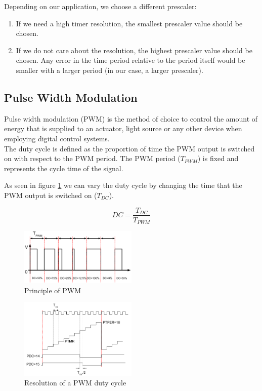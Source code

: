 Depending on our application, we choose a different prescaler:
\begin{enumerate}
    \item If we need a high timer resolution, the smallest prescaler value should be chosen. 
    \item If we do not care about the resolution, the highest prescaler value should be chosen. Any error in the time period relative to the period itself would be smaller with a larger period (in our case, a larger prescaler).
\end{enumerate}

\subsection{Pulse Width Modulation} 

\noindent
Pulse width modulation (PWM) is the method of choice to control the amount of energy that is supplied to an actuator, light source or any other device when employing digital control systems.\\
The duty cycle is defined as the proportion of time the PWM output is switched on with respect to the PWM period.
The PWM period ($T_{PWM}$) is fixed and represents the cycle time of the signal.

\noindent
As seen in figure \ref{fig:pwm_demo} we can vary the duty cycle by changing the time that the PWM output is switched on ($T_{DC}$).

$$DC = \frac{T_{DC}}{T_{PWM}}$$

\begin{figure}[H]
    \centering
    \includegraphics[width=0.5\textwidth]{figures/software/pwm_demo.png}
    \caption{Principle of PWM \cite{alex}}
    \label{fig:pwm_demo}
\end{figure}

\begin{figure}[H]
    \centering
    \includegraphics[width=0.5\textwidth]{figures/software/pwm_choice.png}
     \caption{Resolution of a PWM duty cycle \cite{alex}}
    \label{fig:pwm_choice}
\end{figure}

